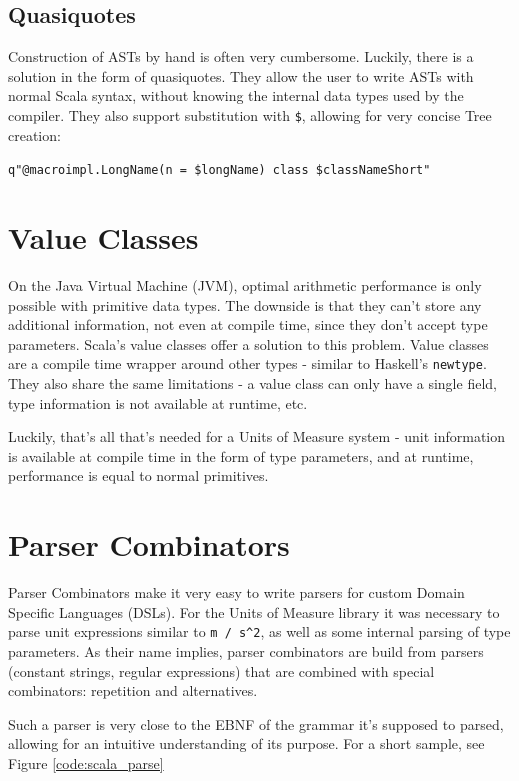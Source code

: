 \documentclass[12pt,oneside,a4paper]{scrbook}
\begin{document}
\subsection{Quasiquotes}

Construction of ASTs by hand is often very cumbersome. Luckily, there is a solution in the form of quasiquotes. They allow the user to write ASTs with normal Scala syntax, without knowing the internal data types used by the compiler. They also support substitution with \verb|$|, allowing for very concise Tree creation:

\verb|q"@macroimpl.LongName(n = $longName) class $classNameShort"|



\section{Value Classes}

On the Java Virtual Machine (JVM), optimal arithmetic performance is only possible with primitive data types. The downside is that they can't store any additional information, not even at compile time, since they don't accept type parameters.
Scala's value classes offer a solution to this problem. Value classes are a compile time wrapper around other types - similar to Haskell's \verb|newtype|. They also share the same limitations - a value class can only have a single field, type information is not available at runtime, etc.

Luckily, that's all that's needed for a Units of Measure system - unit information is available at compile time in the form of type parameters, and at runtime, performance is equal to normal primitives.


\section{Parser Combinators}

Parser Combinators make it very easy to write parsers for custom Domain Specific Languages (DSLs). For the Units of Measure library it was necessary to parse unit expressions similar to \verb|m / s^2|, as well as some internal parsing of type parameters. As their name implies, parser combinators are build from parsers (constant strings, regular expressions) that are combined with special combinators: repetition and alternatives. \citep{Spiewak09}

Such a parser is very close to the EBNF of the grammar it's supposed to parsed, allowing for an intuitive understanding of its purpose. For a short sample, see Figure \ref{code:scala_parse}
\end{document}
